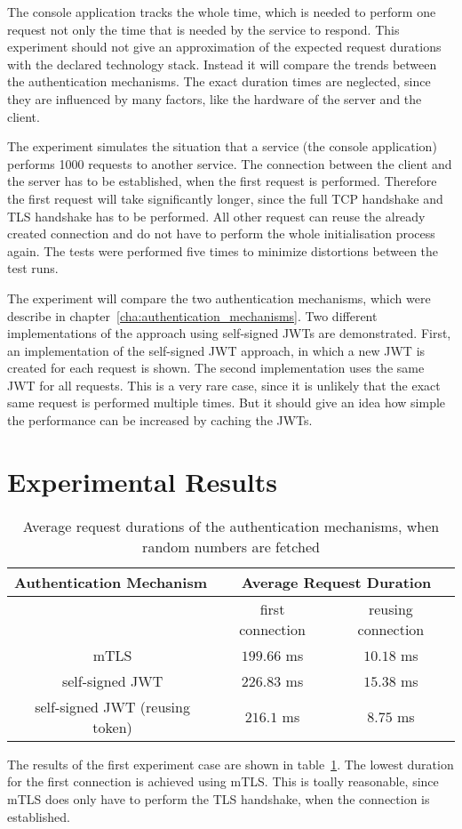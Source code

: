 The console application tracks the whole time, which is needed to perform one request not only the time that is needed by the service to respond.
This experiment should not give an approximation of the expected request durations with the declared technology stack.
Instead it will compare the trends between the authentication mechanisms.
The exact duration times are neglected, since they are influenced by many factors, like the hardware of the server and the client.

The experiment simulates the situation that a service (the console application) performs 1000 requests to another service.
The connection between the client and the server has to be established, when the first request is performed.
Therefore the first request will take significantly longer, since the full TCP handshake and TLS handshake has to be performed.
All other request can reuse the already created connection and do not have to perform the whole initialisation process again.
The tests were performed five times to minimize distortions between the test runs.

The experiment will compare the two authentication mechanisms, which were describe in chapter~\ref{cha:authentication_mechanisms}.
Two different implementations of the approach using self-signed JWTs are demonstrated.
First, an implementation of the self-signed JWT approach, in which a new JWT is created for each request is shown.
The second implementation uses the same JWT for all requests.
This is a very rare case, since it is unlikely that the exact same request is performed multiple times.
But it should give an idea how simple the performance can be increased by caching the JWTs.


\section{Experimental Results}

\begin{table}[H]
\begin{tabular}{c|cc}
\multicolumn{1}{l|}{\textbf{Authentication Mechanism}} & \multicolumn{2}{c}{\textbf{Average Request Duration}} \\ \hline
\multicolumn{1}{c|}{} & \multicolumn{1}{c|}{first connection} & reusing connection \\ \hline
mTLS & \multicolumn{1}{c|}{$199.66$ ms} & $10.18$ ms \\ \hline
self-signed JWT & \multicolumn{1}{c|}{$226.83$ ms} & $15.38$ ms \\ \hline
self-signed JWT (reusing token) & \multicolumn{1}{c|}{$216.1$ ms} & $8.75$ ms
\end{tabular}
\caption{Average request durations of the authentication mechanisms, when random numbers are fetched}
\label{tab:experiment_case_1}
\end{table}

The results of the first experiment case are shown in table~\ref{tab:experiment_case_1}.
The lowest duration for the first connection is achieved using mTLS.
This is toally reasonable, since mTLS does only have to perform the TLS handshake, when the connection is established.



